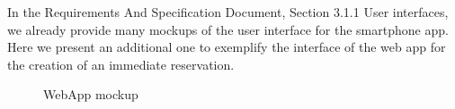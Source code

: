 In the Requirements And Specification Document, Section 3.1.1  User interfaces, we already provide many mockups of the user interface for the smartphone app. Here we present an additional one to exemplify the interface of the web app for the creation of an immediate reservation.\\
\begin{figure}[H]
	\noindent
	\caption{WebApp mockup}
\end{figure}